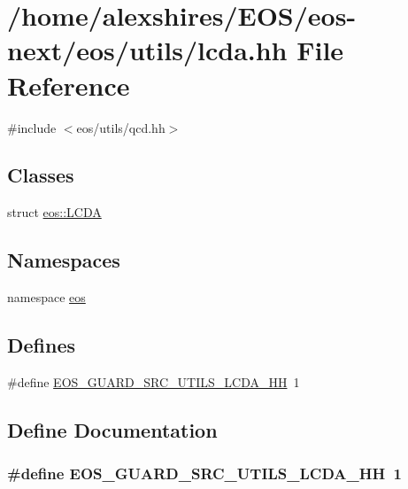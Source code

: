 \hypertarget{lcda_8hh}{
\section{/home/alexshires/EOS/eos-\/next/eos/utils/lcda.hh File Reference}
\label{lcda_8hh}
}
{\ttfamily \#include $<$eos/utils/qcd.hh$>$}\par
\subsection*{Classes}
\begin{DoxyCompactItemize}
\item 
struct \hyperlink{structeos_1_1LCDA}{eos::LCDA}
\end{DoxyCompactItemize}
\subsection*{Namespaces}
\begin{DoxyCompactItemize}
\item 
namespace \hyperlink{namespaceeos}{eos}
\end{DoxyCompactItemize}
\subsection*{Defines}
\begin{DoxyCompactItemize}
\item 
\#define \hyperlink{lcda_8hh_a877e402192a1b4d64d7931c2810d1770}{EOS\_\-GUARD\_\-SRC\_\-UTILS\_\-LCDA\_\-HH}~1
\end{DoxyCompactItemize}


\subsection{Define Documentation}
\hypertarget{lcda_8hh_a877e402192a1b4d64d7931c2810d1770}{
\subsubsection[{EOS\_\-GUARD\_\-SRC\_\-UTILS\_\-LCDA\_\-HH}]{\setlength{\rightskip}{0pt plus 5cm}\#define EOS\_\-GUARD\_\-SRC\_\-UTILS\_\-LCDA\_\-HH~1}}
\label{lcda_8hh_a877e402192a1b4d64d7931c2810d1770}
